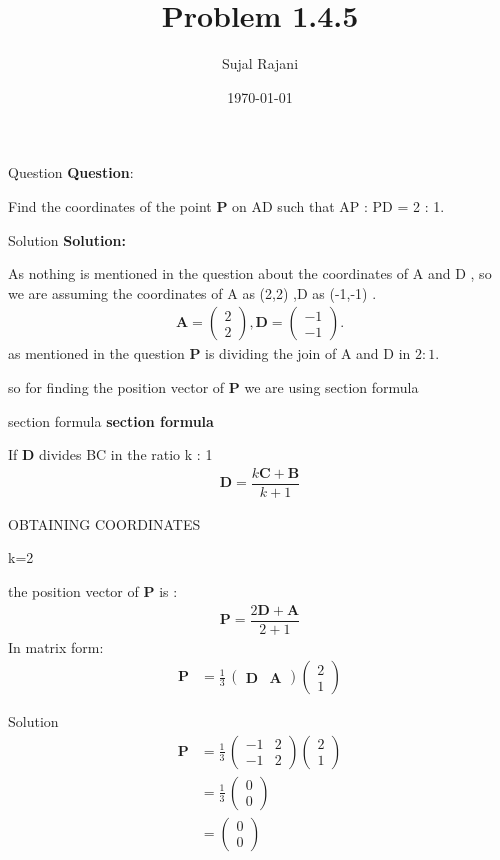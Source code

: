 \documentclass{beamer}
\title{Problem 1.4.5}
\author{Sujal Rajani}
\date{\today}
\let\vec\mathbf
\newcommand{\myvec}[1]{\ensuremath{\begin{pmatrix}#1\end{pmatrix}}}
\theoremstyle{remark}
\numberwithin{equation}{section}
\begin{document}
\begin{frame}
\titlepage
\end{frame}



\begin{frame}{Question}
\textbf{Question}:


\noindent Find the coordinates of the point $\vec{P}$ on AD such that AP : PD = 2 : 1.    
\end{frame}

\begin{frame}{Solution}
\textbf{Solution:} 

As nothing is mentioned in the question about the coordinates of A and D , so we are assuming the coordinates of A as (2,2) ,D as (-1,-1) .
\begin{align}
			\vec A = \myvec{2\\2},\vec D = \myvec{-1\\-1}.
\end{align}
as mentioned in the question $\vec{P}$ is dividing the join of A and D in $2:1$.

so for finding the position vector of $\vec{P}$ we are using section formula 
\end{frame} 

\begin{frame}{section formula }
    \textbf{section formula }

If $\vec{D}$ divides BC in the ratio k : 1
\begin{align*}
     \vec{D}=\dfrac{k\vec{C}+\vec{B}}{k+1}
\end{align*}

\end{frame}
\begin{frame}{OBTAINING COORDINATES}

\quad k=2

    the position vector of $\vec{P}$ is : 
    \\
   \begin{align*}
     \vec{P}=\dfrac{2\vec{D}+\vec{A}}{2+1}
\end{align*}
   In matrix form:
\begin{align}
\vec{P} &= \frac{1}{3}\,\myvec{\vec{D} & \vec{A}}\myvec{2 \\ 1}
\end{align}
\end{frame}
\begin{frame}{Solution}
\begin{align}
\vec{P}
&= \frac{1}{3}\,
   \myvec{-1 & 2\\ -1 & 2}
   \myvec{2 \\ 1} \label{eq:R-sub1} \\[6pt]
&= \frac{1}{3}\,
   \myvec{0 \\ 0} 
   \\
&= \myvec{{0} \\{0}}
\end{align}


\end{frame}
\end{document}
